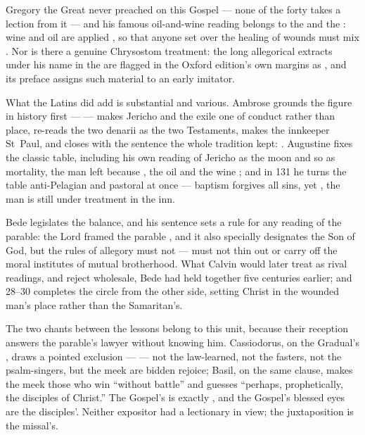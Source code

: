 Gregory the Great never preached on this Gospel --- none of the forty
 takes a lection from it --- and his famous oil-and-wine reading belongs to the
 and the : wine and oil are applied
, so that anyone
set over the healing of wounds must mix . Nor is
there a genuine Chrysostom treatment: the long allegorical extracts under his
name in the  are flagged in the Oxford edition's own
margins as , and its preface assigns such
material to an early imitator.

What the Latins did add is substantial and various. Ambrose grounds the figure
in history first ---  --- makes
Jericho  and the exile one of conduct rather than
place, re-reads the two denarii as the two Testaments, makes the innkeeper
St~Paul, and closes with the sentence the whole tradition kept: . Augustine fixes the classic table, including his own reading of
Jericho as the moon and so as mortality, the man left 
because ,
the oil  and the wine ; and in  131 he turns the table
anti-Pelagian and pastoral at once --- baptism forgives all sins, yet
, the man is still under treatment in the inn.

Bede legislates the balance, and his sentence sets a rule for any reading of
the parable: the Lord framed the parable , and it also specially designates the Son of God, but the rules of
allegory must not  --- must not thin out or carry off the moral institutes
of mutual brotherhood. What Calvin would later treat as rival readings, and
reject wholesale, Bede had held together five centuries earlier; and
\work{Salvifici doloris} 28--30 completes the circle from the other side,
setting Christ in the wounded man's place rather than the Samaritan's.

The two chants between the lessons belong to this unit, because their
reception answers the parable's lawyer without knowing him. Cassiodorus, on
the Gradual's \latin{áudiant mansuéti}, draws a pointed exclusion ---
 ---
not the law-learned, not the fasters, not the psalm-singers, but the meek are
bidden rejoice; Basil, on the same clause, makes the meek those who win
``without battle'' and guesses ``perhaps, prophetically, the disciples of
Christ.'' The Gospel's \latin{legisperítus} is exactly \latin{lege doctus},
and the Gospel's blessed eyes are the disciples'. Neither expositor had a
lectionary in view; the juxtaposition is the missal's.

